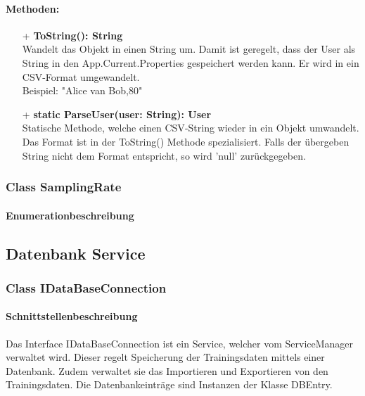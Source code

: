 \documentclass[a4paper,12pt]{article}
\begin{document}
	\paragraph{Methoden:}
	\begin{itemize}
		\item[+] \textbf{ToString(): String}\\Wandelt das Objekt in einen String um. Damit ist geregelt, dass der User als String in den App.Current.Properties gespeichert werden kann. Er wird in ein \Gls{CSV}-Format umgewandelt.\\
		Beispiel: "Alice van Bob,80"\\
		\item[+] \textbf{static ParseUser(user: String): User}\\Statische Methode, welche einen \Gls{CSV}-String wieder in  ein Objekt umwandelt. Das Format ist in der ToString() Methode spezialisiert. Falls der übergeben String nicht dem Format entspricht, so wird 'null' zurückgegeben.\\
	\end{itemize}

\subsubsection{Class SamplingRate}
	\paragraph{Enumerationbeschreibung}

	
	
	
	
	
	
	
\subsection{Datenbank Service}
\subsubsection{Class IDataBaseConnection}
	\paragraph{Schnittstellenbeschreibung}
	Das Interface IDataBaseConnection ist ein Service, welcher vom ServiceManager verwaltet wird. Dieser regelt Speicherung der Trainingsdaten mittels einer \gls{Datenbank}. Zudem verwaltet sie das Importieren und Exportieren von den Trainingsdaten.
	Die Datenbankeinträge sind Instanzen der Klasse DBEntry. 
	
\end{document}
